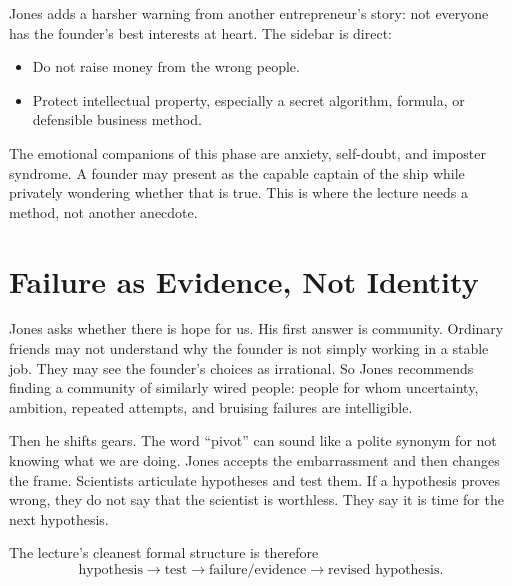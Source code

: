 Jones adds a harsher warning from another entrepreneur's story: not everyone has the founder's best interests at heart. The sidebar is direct:
\begin{itemize}
\item Do not raise money from the wrong people.
\item Protect intellectual property, especially a secret algorithm, formula, or defensible business method.
\end{itemize}

The emotional companions of this phase are anxiety, self-doubt, and imposter syndrome. A founder may present as the capable captain of the ship while privately wondering whether that is true. This is where the lecture needs a method, not another anecdote.

\section{Failure as Evidence, Not Identity}

Jones asks whether there is hope for us. His first answer is community. Ordinary friends may not understand why the founder is not simply working in a stable job. They may see the founder's choices as irrational. So Jones recommends finding a community of similarly wired people: people for whom uncertainty, ambition, repeated attempts, and bruising failures are intelligible.

Then he shifts gears. The word ``pivot'' can sound like a polite synonym for not knowing what we are doing. Jones accepts the embarrassment and then changes the frame. Scientists articulate hypotheses and test them. If a hypothesis proves wrong, they do not say that the scientist is worthless. They say it is time for the next hypothesis.

The lecture's cleanest formal structure is therefore
\begin{equation}
\text{hypothesis}
\longrightarrow
\text{test}
\longrightarrow
\text{failure/evidence}
\longrightarrow
\text{revised hypothesis}.
\end{equation}

